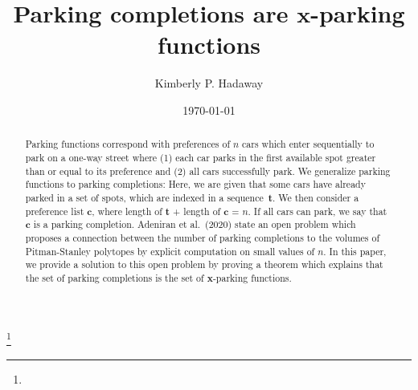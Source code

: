 \documentclass{amsart}
\theoremstyle{definition}
\numberwithin{equation}{section}
\begin{document}
\title{Parking completions are $\mathbf{x}$-parking functions}


\author{Kimberly P. Hadaway}
\address{Iowa State University, Carver Hall, 411 Morrill Road, Ames, IA 50014}
\curraddr{}
\thanks{}



\date{\today}

\dedicatory{}


\begin{abstract}
Parking functions correspond with preferences of $n$ cars which enter sequentially to park on a one-way street where (1) each car parks in the first available spot greater than or equal to its preference and (2) all cars successfully park. 
We generalize parking functions to parking completions: 
Here, we are given that some cars have already parked in a set of spots, which are indexed in a sequence~$\mathbf{t}$. 
We then consider a preference list $\mathbf{c}$, where length of $\mathbf{t}$ + length of $\mathbf{c}$ = $n$. 
If all cars can park, we say that $\mathbf{c}$ is a parking completion. 
Adeniran et al.\ (2020) state an open problem which proposes a connection between the number of parking completions to the volumes of Pitman-Stanley polytopes by explicit computation on small values of $n$. 
In this paper, we provide a solution to this open problem by proving a theorem which explains that the set of parking completions is the set of $\mathbf{x}$-parking functions.
\end{abstract}
\maketitle


\end{document}
